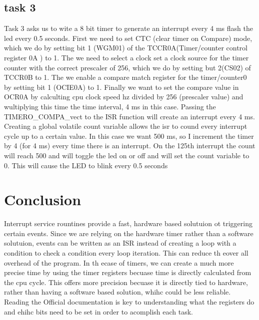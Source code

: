 \subsection{task 3}
Task 3 asks us to wite a 8 bit timer to generate an interrupt every 4 ms flash the led every 0.5 seconds. 
First we need to set CTC (clear timer on Compare) mode, which we do by setting bit 1 (WGM01) of the TCCR0A(Timer/counter control register 0A ) to 1. The we need to select a clock set a clock source for the timer counter with the correct prescaler of 256, which we do by setting but 2(CS02) of TCCR0B to 1. The we enable a compare match register for the timer/counter0 by setting bit 1 (OCIE0A) to 1. Finally we want to set the compare value in OCR0A by calculting cpu clock speed hz divided by 256 (prescaler value) and wultiplying this time the time interval, 4 ms in this case. Passing the TIMERO\_COMPA\_vect to the ISR function will create an interrupt every 4 ms. Creating a global volatile count variable allows the isr to cound every interrupt cycle up to a certain value. In this case we want 500 ms, so I increment the timer by 4 (for 4 ms) every time there is an interrupt. On the 125th interrupt the count will reach 500 and will toggle the led on or off and will set the count variable to 0. This will cause the LED to blink every 0.5 seconds 


\section{Conclusion}
 Interrupt service rountines provide a fast, hardware based solutuion ot triggering certain events. Since we are relying on the hardware timer rather than a software solutuion, events can be written as an ISR instead of creating a loop with a condition to check a condition every loop iteration. This can reduce th eover all overhead of the program. In th ecase of timers, we can create a much more precise time by using the timer registers becuase time is directly calculated from the cpu cycle. This offers more precision becuase it is directly tied to hardware, rather than having a software based solution, whihc could be less reliable. Reading the Official documentation is key to understanding what the registers do and ehihc bits need to be set in order to acomplish each task.



